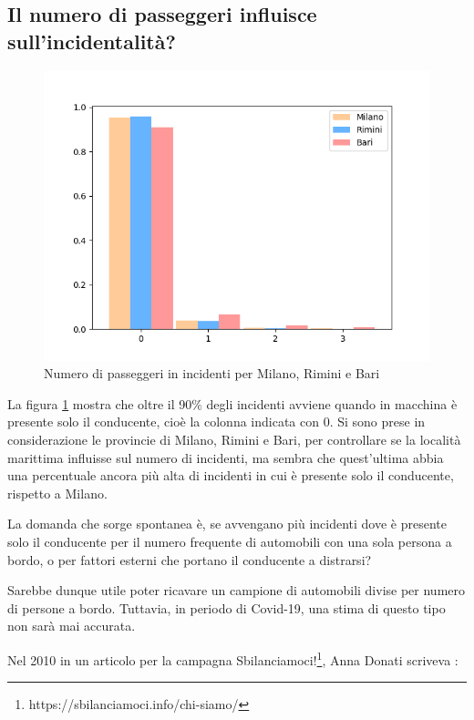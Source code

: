 \documentclass[a4paper]{report}
\begin{document}
\subsection{Il numero di passeggeri influisce sull'incidentalità?}

\begin{figure}
    \includegraphics[width=\linewidth]{../src/incidenti/incidenti_senza_coords/passeggeri/passeggeri.png}
    \caption{Numero di passeggeri in incidenti per Milano, Rimini e Bari}
    \label{fig:passeggeri-milano-rimini}
\end{figure}

La figura \ref{fig:passeggeri-milano-rimini} mostra che oltre il 90\% degli incidenti
avviene quando in macchina è presente solo il conducente, cioè la colonna indicata con 0.
Si sono prese in considerazione le provincie di Milano, Rimini e Bari, 
per controllare se la località marittima influisse sul numero di incidenti, 
ma sembra che quest'ultima abbia una percentuale 
ancora più alta di incidenti in cui è presente solo il conducente, rispetto a Milano.

La domanda che sorge spontanea è, se avvengano più incidenti dove è presente 
solo il conducente per il numero frequente di automobili con una sola persona a 
bordo, o per fattori esterni che portano il conducente a distrarsi?

Sarebbe dunque utile poter ricavare un campione di automobili divise per numero 
di persone a bordo. 
Tuttavia, in periodo di Covid-19, una stima di questo tipo non sarà mai accurata.

Nel 2010 in un articolo per la campagna 
Sbilanciamoci!\footnote{https://sbilanciamoci.info/chi-siamo/}, 
Anna Donati scriveva \cite{SBILANCIAMOCI:1}: 
\end{document}
